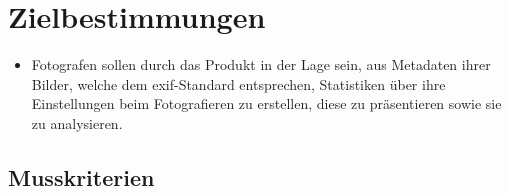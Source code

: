 \section{Zielbestimmungen}

\begin{itemize}
  \item Fotografen sollen durch das Produkt in der Lage sein, aus Metadaten ihrer Bilder, welche dem \gls{exif}-Standard entsprechen, Statistiken über ihre Einstellungen beim Fotografieren zu erstellen, diese zu präsentieren sowie sie zu analysieren.
\end{itemize} 

\subsection{Musskriterien}

\label{subsec:musskriterien}

